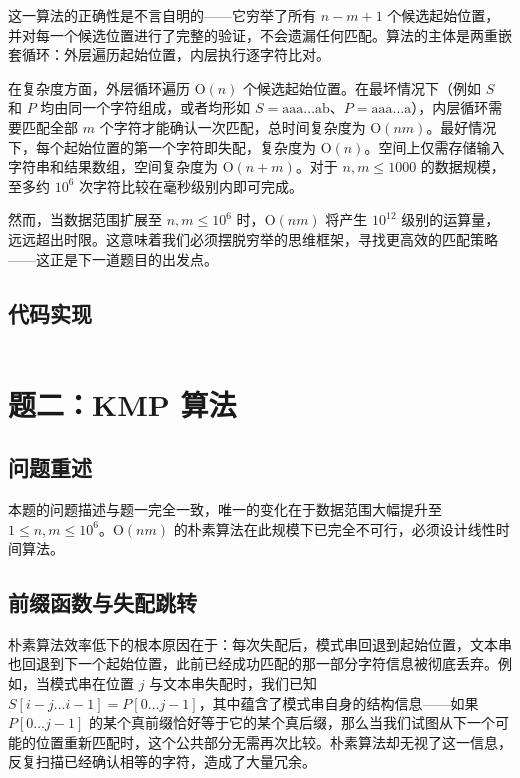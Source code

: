 \documentclass[12pt, a4paper]{academics}
\begin{document}
这一算法的正确性是不言自明的——它穷举了所有 $n - m + 1$ 个候选起始位置，并对每一个候选位置进行了完整的验证，不会遗漏任何匹配。算法的主体是两重嵌套循环：外层遍历起始位置，内层执行逐字符比对。

在复杂度方面，外层循环遍历 $\mathrm{O}(n)$ 个候选起始位置。在最坏情况下（例如 $S$ 和 $P$ 均由同一个字符组成，或者均形如 $S = \text{aaa}\dots\text{ab}$、$P = \text{aaa}\dots\text{a}$），内层循环需要匹配全部 $m$ 个字符才能确认一次匹配，总时间复杂度为 $\mathrm{O}(nm)$。最好情况下，每个起始位置的第一个字符即失配，复杂度为 $\mathrm{O}(n)$。空间上仅需存储输入字符串和结果数组，空间复杂度为 $\mathrm{O}(n + m)$。对于 $n, m \le 1000$ 的数据规模，至多约 $10^6$ 次字符比较在毫秒级别内即可完成。

然而，当数据范围扩展至 $n, m \le 10^6$ 时，$\mathrm{O}(nm)$ 将产生 $10^{12}$ 级别的运算量，远远超出时限。这意味着我们必须摆脱穷举的思维框架，寻找更高效的匹配策略——这正是下一道题目的出发点。

\subsection{代码实现}

\inputminted{c++}{../src/p1_naive.cpp}

\section{题二：KMP 算法}

\subsection{问题重述}

本题的问题描述与题一完全一致，唯一的变化在于数据范围大幅提升至 $1 \le n, m \le 10^6$。$\mathrm{O}(nm)$ 的朴素算法在此规模下已完全不可行，必须设计线性时间算法。

\subsection{前缀函数与失配跳转}

朴素算法效率低下的根本原因在于：每次失配后，模式串回退到起始位置，文本串也回退到下一个起始位置，此前已经成功匹配的那一部分字符信息被彻底丢弃。例如，当模式串在位置 $j$ 与文本串失配时，我们已知 $S[i-j \dots i-1] = P[0 \dots j-1]$，其中蕴含了模式串自身的结构信息——如果 $P[0 \dots j-1]$ 的某个真前缀恰好等于它的某个真后缀，那么当我们试图从下一个可能的位置重新匹配时，这个公共部分无需再次比较。朴素算法却无视了这一信息，反复扫描已经确认相等的字符，造成了大量冗余。
\end{document}
